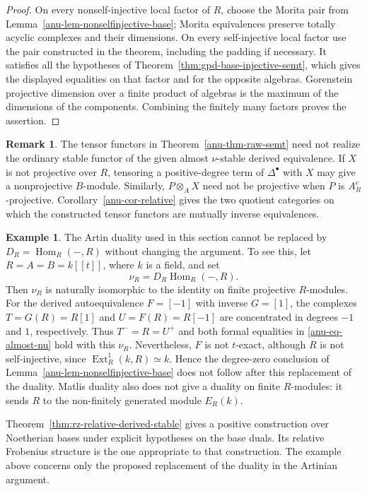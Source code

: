 \documentclass[12pt,a4paper,english,reqno]{amsart}
\numberwithin{equation}{section}
\theoremstyle{plain}
\theoremstyle{definition}
\newtheorem{example}[theorem]{Example}
\newtheorem{remark}[theorem]{Remark}
\begin{document}
\begin{proof}
On every nonself-injective local factor of $R$, choose the Morita
pair from Lemma~\ref{anu-lem-nonselfinjective-base}; Morita
equivalences preserve totally acyclic complexes and their
dimensions.  On every self-injective local factor use the pair
constructed in the theorem, including the padding if necessary.
It satisfies all the hypotheses of
Theorem~\ref{thm:gpd-base-injective-semt}, which gives the displayed
equalities on that factor and for the opposite algebras.
Gorenstein projective dimension over a finite product of algebras
is the maximum of the dimensions of the components.  Combining
the finitely many factors proves the assertion.
\end{proof}

\begin{remark}\label{anu-rem-ordinary-boundary}
The tensor functors in Theorem~\ref{anu-thm-raw-semt} need not
realize the ordinary stable functor of the given almost
$\nu$-stable derived equivalence.  If $X$ is not projective over
$R$, tensoring a positive-degree term of $\Delta^\bullet$ with
$X$ may give a nonprojective $B$-module.  Similarly,
$P\otimes_AX$ need not be projective when $P$ is
$A_R^e$-projective.  Corollary~\ref{anu-cor-relative} gives the
two quotient categories on which the constructed tensor functors
are mutually inverse equivalences.
\end{remark}

\begin{example}\label{anu-ex-noetherian-nakayama-boundary}
The Artin duality used in this section cannot be replaced by
$D_R=\operatorname{Hom}_R(-,R)$ without changing the argument.
To see this, let $R=A=B=k[[t]]$, where $k$ is a field, and set
\[
 \nu_R=D_R\operatorname{Hom}_R(-,R).
\]
Then $\nu_R$ is naturally isomorphic to the identity on finite
projective $R$-modules.  For the derived autoequivalence $F=[-1]$
with inverse $G=[1]$, the complexes $T=G(R)=R[1]$ and
$U=F(R)=R[-1]$ are concentrated in degrees $-1$ and $1$,
respectively.  Thus $T^-=R=U^+$ and both formal equalities in
\eqref{anu-eq-almost-nu} hold with this $\nu_R$.
Nevertheless, $F$ is not $t$-exact, although $R$ is not
self-injective, since $\operatorname{Ext}_R^1(k,R)\simeq k$.
Hence the degree-zero conclusion of
Lemma~\ref{anu-lem-nonselfinjective-base} does not follow after
this replacement of the duality.  Matlis duality also does not
give a duality on finite $R$-modules: it sends $R$ to the
non-finitely generated module $E_R(k)$.

Theorem~\ref{thm:rz-relative-derived-stable} gives a positive
construction over Noetherian bases under explicit hypotheses on
the base duals.  Its relative Frobenius structure is the one
appropriate to that construction.  The example above concerns
only the proposed replacement of the duality in the Artinian
argument.
\end{example}
\end{document}

